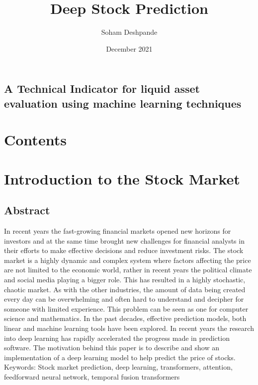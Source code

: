 \documentclass{article}
\title{Deep Stock Prediction}
\author{Soham Deshpande}
\date{December 2021}
\begin{document}
\maketitle
\subsection*{A Technical Indicator for  liquid asset evaluation using machine learning techniques }
\clearpage
\section{Contents}
\clearpage

\section {Introduction to the Stock Market}
\subsection{Abstract}
\normalsize{In recent years the fast-growing financial markets opened new horizons for investors and at the same time brought new challenges for financial analysts in their efforts to make effective decisions and reduce investment risks.
The stock market is a highly dynamic and complex system where factors affecting the price are not limited to the economic world, rather in recent years the political climate and social media playing a bigger role. This has resulted in a highly stochastic, chaotic market. As with the other industries, the amount of data being created every day can be overwhelming and often hard to understand and decipher for someone with limited experience. This problem can be seen as one for computer science and mathematics.
In the past decades, effective prediction models, both linear and machine learning tools have been explored. In recent years the research into deep learning has rapidly accelerated the progress made in prediction software. The motivation behind this paper is to describe and show an implementation of a deep learning model to help predict the price of stocks.
\\
Keywords:
Stock market prediction, deep learning, transformers, attention, feedforward neural network, temporal fusion transformers
}
\end{document}
